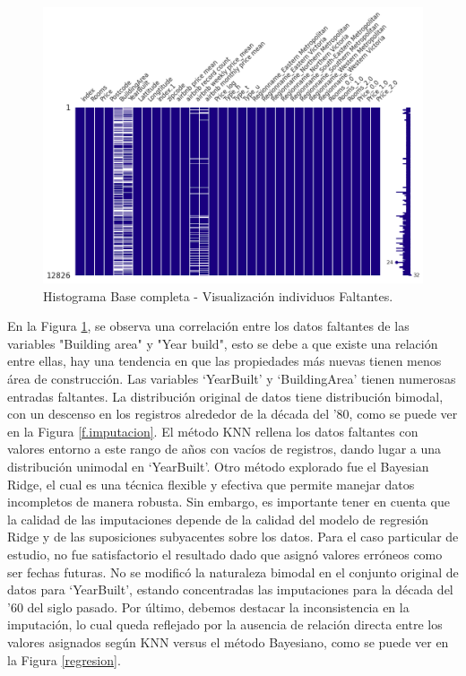 \begin{figure} [!ht]
\begin{center}
\includegraphics[width=1.0\columnwidth]{img/datosfaltantes2.png}
\caption{Histograma Base completa - Visualización individuos Faltantes.}
\label{faltantes2}
\end{center}
\end{figure}

En la Figura \ref{faltantes2}, se observa una correlación entre los datos faltantes de las variables "Building area" y "Year build", esto se debe a que existe una relación entre ellas, hay una tendencia en que las propiedades más nuevas tienen menos área de construcción.
Las variables `YearBuilt' y `BuildingArea' tienen numerosas entradas faltantes. La distribución original de datos tiene distribución bimodal, con un descenso en los registros alrededor de la década del '80, como se puede ver en la Figura \ref{f.imputacion}. El método KNN rellena los datos faltantes con valores entorno a este rango de años con vacíos de registros, dando lugar a una distribución unimodal en `YearBuilt'. 
Otro método explorado fue el Bayesian Ridge, el cual es una técnica flexible y efectiva que permite manejar datos incompletos de manera robusta. Sin embargo, es importante tener en cuenta que la calidad de las imputaciones depende de la calidad del modelo de regresión Ridge y de las suposiciones subyacentes sobre los datos. Para el caso particular de estudio, no fue satisfactorio el resultado dado que asignó valores erróneos como ser fechas futuras. No se modificó la naturaleza bimodal en el conjunto original de datos para `YearBuilt', estando concentradas las imputaciones para la década del '60 del siglo pasado. Por último, debemos destacar la inconsistencia en la imputación, lo cual queda reflejado por la ausencia de relación directa entre los valores asignados según KNN versus el método Bayesiano, como se puede ver en la Figura \ref{regresion}.

